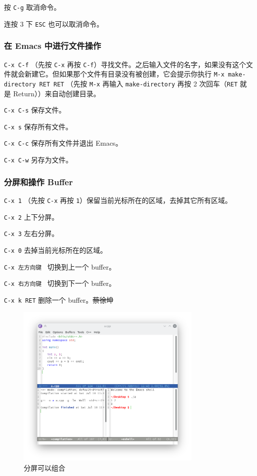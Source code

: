 \documentclass[UTF-8]{ctexart}
\begin{document}
				按 \texttt{C-g} 取消命令。
				
				连按 3 下 \texttt{ESC} 也可以取消命令。
				
			\subsubsection{在 Emacs 中进行文件操作}
			
				\texttt{C-x C-f} （先按 \texttt{C-x} 再按 \texttt{C-f}）寻找文件。之后输入文件的名字，如果没有这个文件就会新建它。但如果那个文件有目录没有被创建，它会提示你执行 \texttt{M-x make-directory RET RET} （先按 \texttt{M-x} 再输入 \texttt{make-directory} 再按 2 次回车（\texttt{RET} 就是 Return））来自动创建目录。
				
				\texttt{C-x C-s} 保存文件。
				
				\texttt{C-x s} 保存所有文件。
				
				\texttt{C-x C-c} 保存所有文件并退出 Emacs。
				
				\texttt{C-x C-w} 另存为文件。
			
			\subsubsection{分屏和操作 Buffer}
				
				\texttt{C-x 1} （先按 \texttt{C-x} 再按 \texttt{1}）保留当前光标所在的区域，去掉其它所有区域。
				
				\texttt{C-x 2} 上下分屏。
				
				\texttt{C-x 3} 左右分屏。
				
				\texttt{C-x 0} 去掉当前光标所在的区域。
				
				\texttt{C-x 左方向键} ~切换到上一个 buffer。
				
				\texttt{C-x 右方向键} ~切换到下一个 buffer。
				
				\texttt{C-x k RET} 删除一个 buffer。\sout{蔡徐坤}
				
				\begin{figure}[H]
					\centering
					\includegraphics[width=0.8\textwidth]{fig/emacs_teach_split.png}
					\caption*{分屏可以组合}
				\end{figure}
			
\end{document}
